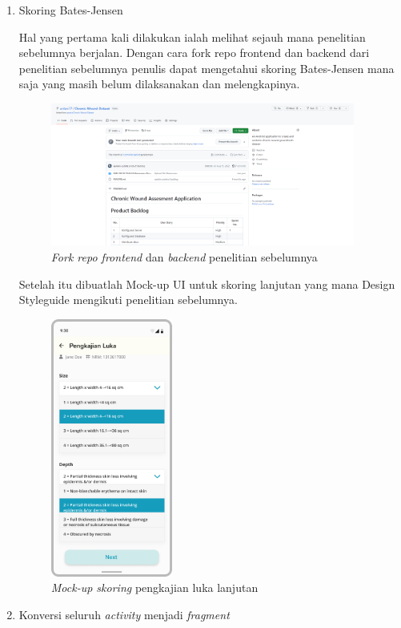 \begin{enumerate}
	\item Skoring Bates-Jensen
	
	Hal yang pertama kali dilakukan ialah melihat sejauh mana penelitian sebelumnya berjalan. Dengan cara fork repo frontend dan backend dari penelitian sebelumnya penulis dapat mengetahui skoring Bates-Jensen mana saja yang masih belum dilaksanakan dan melengkapinya.
	\begin{figure}[H]
		\centering
		\includegraphics[keepaspectratio, width=10cm]{gambar/fork_repo}
		\caption{\textit{Fork repo frontend} dan \textit{backend} penelitian sebelumnya}
		\label{gambar:fork_repo}
	\end{figure}
	
	Setelah itu dibuatlah Mock-up UI untuk skoring lanjutan yang mana Design Styleguide mengikuti penelitian sebelumnya.
	\begin{figure}[H]
		\centering
		\includegraphics[keepaspectratio, width=4cm]{gambar/mockup_skoring}
		\caption{\textit{Mock-up skoring} pengkajian luka lanjutan}
		\label{gambar:mockup_skoring}
	\end{figure}
	
	\item Konversi seluruh \textit{activity} menjadi \textit{fragment}
	

\end{enumerate}
